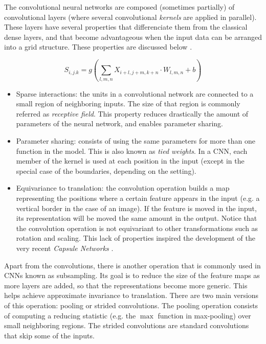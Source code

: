 The convolutional neural networks are composed (sometimes partially) of convolutional layers (where several convolutional \textit{kernels} are applied in parallel). These layers have several properties that differenciate them from the classical dense layers, and that become advantageous when the input data can be arranged into a grid structure. These properties are discussed below \autocite{Goodfellow2016}.

\begin{equation}
\label{eq:cnnformula}
S_{i,j.k} = g\left(\sum_{l,m,n}{X_{i+l, j+m, k+n} \cdot W_{l,m,n} + b}\right)
\end{equation}

\begin{itemize}
	\item Sparse interactions: the units in a convolutional network are connected to a small region of neighboring inputs. The size of that region is commonly referred as \textit{receptive field}. This property reduces drastically the amount of parameters of the neural network, and enables parameter sharing.
	\item Parameter sharing: consists of using the same parameters for more than one function in the model. This is also known as \textit{tied weights}. In a CNN, each member of the kernel is used at each position in the input (except in the special case of the boundaries, depending on the setting).
	\item Equivariance to translation: the convolution operation builds a map representing the positions where a certain feature appears in the input (e.g. a vertical border in the case of an image). If the feature is moved in the input, its representation will be moved the same amount in the output. Notice that the convolution operation is not equivariant to other transformations such as rotation and scaling. This lack of properties inspired the development of the very recent \textit{Capsule Networks} \autocite{sabour2017}.
\end{itemize}

Apart from the convolutions, there is another operation that is commonly used in CNNs known as subsampling. Its goal is to reduce the size of the feature maps as more layers are added, so that the representations become more generic. This helps achieve approximate invariance to translation. There are two main versions of this operation: pooling or strided convolutions. The pooling operation \autocite{Goodfellow2016} consists of computing a reducing statistic (e.g. the $\max$ function in max-pooling) over small neighboring regions. The strided convolutions \autocite{riadh2020} are standard convolutions that skip some of the inputs.

